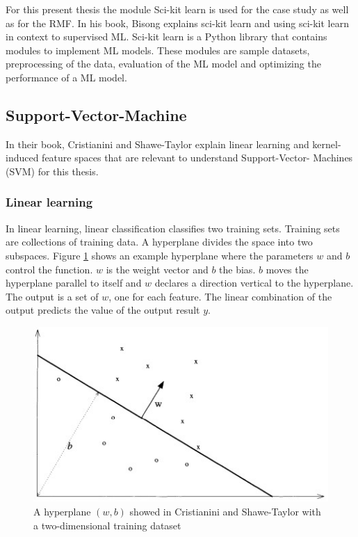 For this present thesis the module Sci-kit learn is used for the case study as well as for the RMF. In his book, Bisong \cite{Bisong_2019} explains sci-kit learn and using sci-kit learn
in context to supervised ML. Sci-kit learn is a Python library that contains modules to implement ML models. These modules are sample datasets, preprocessing of the data, evaluation of
the ML model and optimizing the performance of a ML model.

\subsection{Support-Vector-Machine}

In their book, Cristianini and Shawe-Taylor \cite{cristianini_shawe-taylor_2000} explain linear learning and kernel-induced feature spaces that are relevant to understand Support-Vector-
Machines (SVM) for this thesis.

\subsubsection*{Linear learning}

In linear learning, linear classification classifies two training sets. Training sets are collections of training data. A hyperplane divides the space into two subspaces.
\cite{cristianini_shawe-taylor_2000} Figure \ref{fig:hyperplane} shows an example hyperplane where the parameters $w$ and $b$ control the function. $w$ is the weight vector and $b$ the
bias. $b$ moves the hyperplane parallel to itself and $w$ declares a direction vertical to the hyperplane. The output is a set of $w$, one for each feature. The linear combination of the
output predicts the value of the output result $y$.

\begin{figure}[ht!]
  \centering
  \includegraphics[width=12cm]{pictures/hyperplane.jpg}
  \caption{A hyperplane $(w, b)$ showed in Cristianini and Shawe-Taylor \cite{cristianini_shawe-taylor_2000} with a two-dimensional training dataset}
  \label{fig:hyperplane}
\end{figure}

